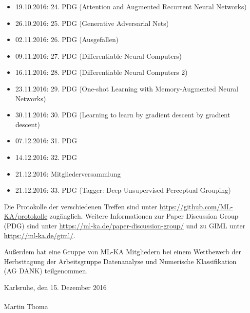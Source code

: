 \documentclass[a4paper]{scrartcl}
\begin{document}
\begin{itemize}
    \item 19.10.2016: 24. PDG (Attention and Augmented Recurrent Neural Networks)
    \item 26.10.2016: 25. PDG (Generative Adversarial Nets)
    \item 02.11.2016: 26. PDG (Ausgefallen)
    \item 09.11.2016: 27. PDG (Differentiable Neural Computers)
    \item 16.11.2016: 28. PDG (Differentiable Neural Computers 2)
    \item 23.11.2016: 29. PDG (One-shot Learning with Memory-Augmented Neural Networks)
    \item 30.11.2016: 30. PDG (Learning to learn by gradient descent by gradient descent)
    \item 07.12.2016: 31. PDG
    \item 14.12.2016: 32. PDG
    \item 21.12.2016: Mitgliederversammlung
    \item 21.12.2016: 33. PDG (Tagger: Deep Unsupervised Perceptual Grouping)
\end{itemize}

Die Protokolle der verschiedenen Treffen sind unter \url{https://github.com/ML-KA/protokolle}
zugänglich. Weitere Informationen zur Paper Discussion Group (PDG) sind unter \url{https://ml-ka.de/paper-discussion-group/} und zu GIML unter \url{https://ml-ka.de/giml/}.

Außerdem hat eine Gruppe von ML-KA Mitgliedern bei einem Wettbewerb der
Herbsttagung der Arbeitsgruppe Datenanalyse und Numerische Klassifikation (AG
DANK) teilgenommen.

\vspace{2cm}
Karlsruhe, den 15. Dezember 2016\\
\vspace{1cm}\\
Martin Thoma
\end{document}
